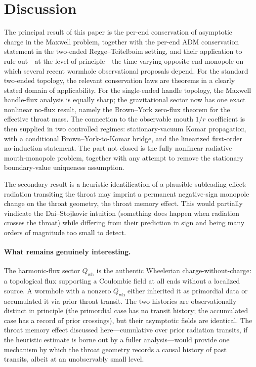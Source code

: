 \documentclass[aps,prd,onecolumn,nofootinbib,superscriptaddress]{revtex4-2}
\begin{document}
\section{Discussion}
\label{sec:discussion}

The principal result of this paper is the per-end conservation of asymptotic
charge in the Maxwell problem, together with the per-end ADM
conservation statement in the two-ended Regge--Teitelboim setting, and their
application to rule out---at the level of principle---the time-varying
opposite-end monopole on which several recent wormhole observational proposals
depend.  For the standard two-ended topology, the relevant conservation laws are
theorems in a clearly stated domain of applicability.  For the single-ended handle
topology, the Maxwell handle-flux analysis is equally sharp; the gravitational
sector now has one exact nonlinear no-flux result, namely the Brown--York
zero-flux theorem for the effective throat mass.  The connection to the
observable mouth $1/r$ coefficient is then supplied in two controlled regimes:
stationary-vacuum Komar propagation, with a conditional Brown--York-to-Komar
bridge, and the linearized first-order no-induction statement.  The part not
closed is the fully nonlinear radiative mouth-monopole problem, together with
any attempt to remove the stationary boundary-value uniqueness assumption.

The secondary result is a heuristic identification of a plausible subleading
effect: radiation transiting the throat may imprint a permanent negative-sign
monopole change on the throat geometry, the throat memory effect.  This would
partially vindicate the Dai--Stojkovic intuition (something does happen when
radiation crosses the throat) while differing from their prediction in sign and
being many orders of magnitude too small to detect.

\paragraph{What remains genuinely interesting.}
The harmonic-flux sector $Q_{\mathrm{wh}}$ is the authentic Wheelerian
charge-without-charge: a topological flux supporting a Coulombic field at all
ends without a localized source.  A wormhole with a nonzero $Q_{\mathrm{wh}}$
either inherited it as primordial data or accumulated it via prior throat
transit.  The two histories are observationally distinct in principle (the
primordial case has no transit history; the accumulated case has a record of
prior crossings), but their asymptotic fields are identical.  The throat memory
effect discussed here---cumulative over prior radiation transits, if the
heuristic estimate is borne out by a fuller analysis---would provide one
mechanism by which the throat geometry records a causal history of past
transits, albeit at an unobservably small level.
\end{document}
